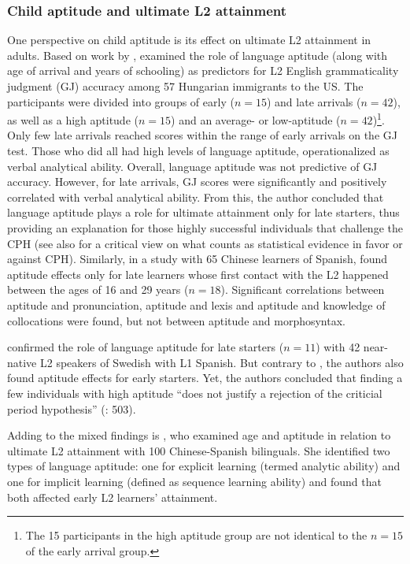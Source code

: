 \documentclass[output=paper]{langscibook}
\begin{document}
\subsubsection{Child aptitude and ultimate L2 attainment} %

One perspective on child aptitude is its effect on ultimate L2 attainment in adults. Based on work by \citet{JohnsonNewport1989}, \citet{DeKeyser2000} examined the role of language aptitude (along with age of arrival and years of schooling) as predictors for L2 English grammaticality judgment (GJ) accuracy among 57 Hungarian immigrants to the US. The participants were divided into groups of early ($n=15$) and late arrivals ($n=42$), as well as a high aptitude ($n=15$) and an average- or low-aptitude ($n=42$)\footnote{The 15 participants in the high aptitude group are not identical to the $n=15$ of the early arrival group.}. Only few late arrivals reached scores within the range of early arrivals on the GJ test. Those who did all had high levels of language aptitude, operationalized as verbal analytical ability. Overall, language aptitude was not predictive of GJ accuracy. However, for late arrivals, GJ scores were significantly and positively correlated with verbal analytical ability. From this, the author concluded that language aptitude plays a role for ultimate attainment only for late starters, thus providing an explanation for those highly successful individuals that challenge the CPH (see also \citealt{Vanhove2013} for a critical view on what counts as statistical evidence in favor or against CPH). Similarly, in a study with 65 Chinese learners of Spanish, \citet{GranenaLong2012} found aptitude effects only for late learners whose first contact with the L2 happened between the ages of 16 and 29 years ($n=18$). Significant correlations between aptitude and pronunciation, aptitude and lexis and aptitude and knowledge of collocations were found, but not between aptitude and morphosyntax. 

\citet{AbrahamssonHyltenstam2008} confirmed the role of language aptitude for late starters ($n=11$) with 42 near-native L2 speakers of Swedish with L1 Spanish. But contrary to \citet{DeKeyser2000}, the authors also found aptitude effects for early starters. Yet, the authors concluded that finding a few individuals with high aptitude “does not justify a rejection of the criticial period hypothesis” (\citealt{AbrahamssonHyltenstam2008}: 503).  

Adding to the mixed findings is \citet{Granena2012}, who examined age and aptitude in relation to ultimate L2 attainment with 100 Chinese-Spanish bilinguals. She identified two types of language aptitude: one for explicit learning (termed analytic ability) and one for implicit learning (defined as sequence learning ability) and found that both affected early L2 learners’ attainment. 
\end{document}
